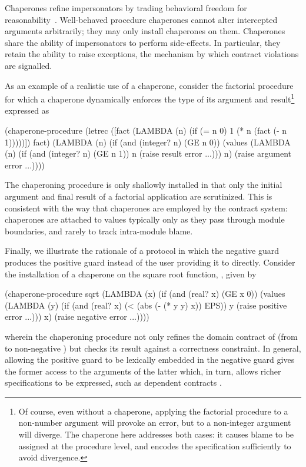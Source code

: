 \documentclass{sigplanconf}
\begin{document}
Chaperones refine impersonators by trading behavioral freedom for reasonability~\cite{strickland2012chaperones}.
Well-behaved procedure chaperones cannot alter intercepted arguments arbitrarily; they may only install chaperones on them.
Chaperones share the ability of impersonators to perform side-effects.
In particular, they retain the ability to raise exceptions, the mechanism by which contract violations are signalled.

As an example of a realistic use of a chaperone, consider the factorial procedure for which a chaperone dynamically enforces the type of its argument and result\footnote{Of course, even without a chaperone, applying the factorial procedure to a non-number argument will provoke an error, but to a non-integer argument will diverge. The chaperone here addresses both cases: it causes blame to be assigned at the procedure level, and encodes the specification sufficiently to avoid divergence.} expressed as
\begin{schemedisplay}
(chaperone-procedure
 (letrec ([fact (LAMBDA (n)
                  (if (= n 0)
                      1
                      (* n (fact (- n 1)))))])
   fact)
 (LAMBDA (n)
   (if (and (integer? n) (GE n 0))
       (values (LAMBDA (n)
                 (if (and (integer? n) (GE n 1))
                     n
                     (raise result error ...)))
               n)
       (raise argument error ...))))
\end{schemedisplay}
The chaperoning procedure is only shallowly installed in that only the initial argument and final result of a factorial application are scrutinized.
This is consistent with the way that chaperones are employed by the contract system: chaperones are attached to values typically only as they pass through module boundaries, and rarely to track intra-module blame.

Finally, we illustrate the rationale of a protocol in which the negative guard produces the positive guard instead of the user providing it to  directly.
Consider the installation of a chaperone on the square root function, , given by
\begin{schemedisplay}
(chaperone-procedure
 sqrt
 (LAMBDA (x)
   (if (and (real? x) (GE x 0))
       (values (LAMBDA (y)
                 (if (and (real? x) (< (abs (- (* y y) x)) EPS))
                     y
                     (raise positive error ...)))
               x)
       (raise negative error ...))))
\end{schemedisplay}
wherein the chaperoning procedure not only refines the domain contract of  (from  to non-negative ) but checks its result against a correctness constraint.
In general, allowing the positive guard to be lexically embedded in the negative guard gives the former access to the arguments of the latter which, in turn, allows richer specifications to be expressed, such as dependent contracts \cite{findler2002contracts}.
\end{document}
